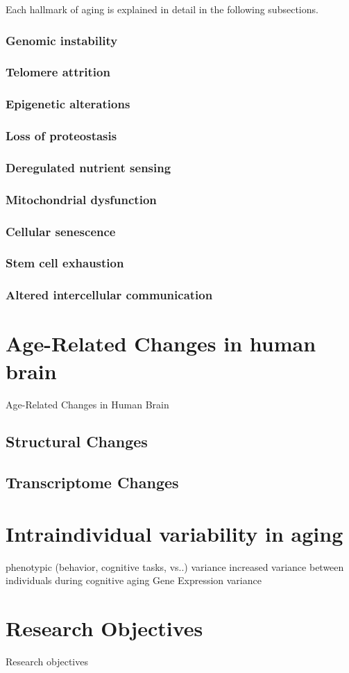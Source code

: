Each hallmark of aging is explained in detail in the following subsections.
\subsubsection{Genomic instability}
\subsubsection{Telomere attrition}
\subsubsection{Epigenetic alterations}
\subsubsection{Loss of proteostasis}
\subsubsection{Deregulated nutrient sensing}
\subsubsection{Mitochondrial dysfunction}
\subsubsection{Cellular senescence}
\subsubsection{Stem cell exhaustion}
\subsubsection{Altered intercellular communication}

\section{Age-Related Changes in human brain}
Age-Related Changes in Human Brain
\subsection{Structural Changes}
\subsection{Transcriptome Changes}

\section{Intraindividual variability in aging}
phenotypic (behavior, cognitive tasks, vs..) variance
increased variance between individuals during cognitive aging
Gene Expression variance

\section{Research Objectives}
Research objectives




